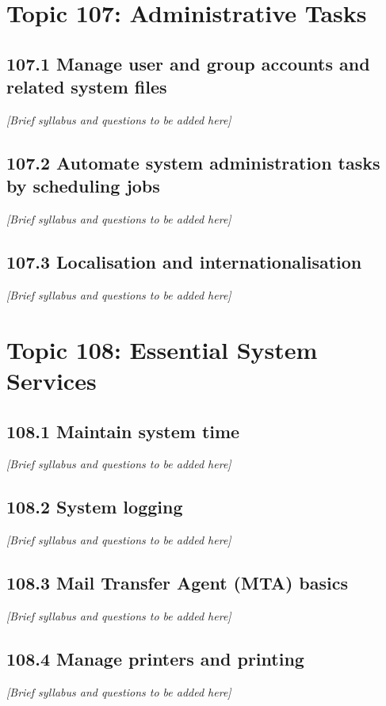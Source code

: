 \documentclass[a4paper]{report}
\begin{document}
\chapter{Topic 107: Administrative Tasks}
\section{107.1 Manage user and group accounts and related system files}
\textit{[Brief syllabus and questions to be added here]}

\section{107.2 Automate system administration tasks by scheduling jobs}
\textit{[Brief syllabus and questions to be added here]}

\section{107.3 Localisation and internationalisation}
\textit{[Brief syllabus and questions to be added here]}

\chapter{Topic 108: Essential System Services}
\section{108.1 Maintain system time}
\textit{[Brief syllabus and questions to be added here]}

\section{108.2 System logging}
\textit{[Brief syllabus and questions to be added here]}

\section{108.3 Mail Transfer Agent (MTA) basics}
\textit{[Brief syllabus and questions to be added here]}

\section{108.4 Manage printers and printing}
\textit{[Brief syllabus and questions to be added here]}
\end{document}
